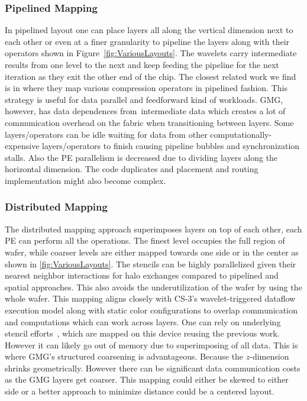\documentclass[sigconf]{acmart}
\begin{document}
\subsubsection{Pipelined Mapping}
        In pipelined layout one can place layers all along the vertical dimension next to each other or even at a finer granularity to pipeline the layers along with their operators shown in Figure~\ref{fig:VariousLayouts}. The wavelets carry intermediate results from one level to the next and keep feeding the pipeline for the next iteration as they exit the other end of the chip. The closest related work we find is in \cite{CereSZ} where they map various compression operators in pipelined fashion. This strategy is useful for data parallel and feedforward kind of workloads. GMG, however, has data dependences from intermediate data which creates a lot of communication overhead on the fabric when transitioning between layers. Some layers/operators can be idle waiting for data from other computationally-expensive layers/operators to finish causing pipeline bubbles and synchronization stalls. Also the PE parallelism is decreased due to dividing layers along the horizontal dimension. The code duplicates and placement and routing implementation might also become complex.

\subsubsection{Distributed Mapping}
        The distributed mapping approach superimposes layers on top of each other, each PE can perform all the operations. The finest level occupies the full region of wafer, while coarser levels are either mapped towards one side or in the center as shown in \ref{fig:VariousLayouts}. The stencils can be highly parallelized given their nearest neighbor interactions for halo exchanges compared to pipelined and spatial approaches. This also avoids the underutilization of the wafer by using the whole wafer. This mapping aligns closely with CS-3's wavelet-triggered dataflow execution model along with static color configurations to overlap communication and computations which can work across layers. One can rely on underlying stencil efforts~\cite{Rocki,mathias}, which are mapped on this device reusing the previous work. However it can likely go out of memory due to superimposing of all data.  This is where GMG’s structured coarsening is advantageous. Because the $z$-dimension shrinks geometrically. However there can be significant data communication costs as the GMG layers get coarser. This mapping could either be skewed to either side or a better approach to minimize distance could be a centered layout.
\end{document}
